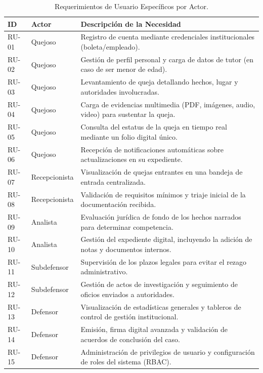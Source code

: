 \documentclass[12pt, oneside, letterpaper]{book}
\begin{document}
\begin{table}[H]
\centering
\caption{Requerimientos de Usuario Específicos por Actor.}
\begin{tabularx}{\textwidth}{@{} l l L @{}}
\toprule
{}
\textbf{\color{white} ID} & \textbf{\color{white} Actor} &
\textbf{\color{white} Descripción de la Necesidad} \\ \midrule
{}
RU-01 & Quejoso & Registro de cuenta mediante credenciales institucionales (boleta/empleado). \\
RU-02 & Quejoso & Gestión de perfil personal y carga de datos de tutor (en caso de ser menor de edad). \\
RU-03 & Quejoso & Levantamiento de queja detallando hechos, lugar y autoridades involucradas. \\
RU-04 & Quejoso & Carga de evidencias multimedia (PDF, imágenes, audio, video) para sustentar la queja. \\
RU-05 & Quejoso & Consulta del estatus de la queja en tiempo real mediante un folio digital único. \\
RU-06 & Quejoso & Recepción de notificaciones automáticas sobre actualizaciones en su expediente. \\ \midrule
{}
RU-07 & Recepcionista & Visualización de quejas entrantes en una bandeja de entrada centralizada. \\
RU-08 & Recepcionista & Validación de requisitos mínimos y triaje inicial de la documentación recibida. \\ \midrule
{}
RU-09 & Analista & Evaluación jurídica de fondo de los hechos narrados para determinar competencia. \\
RU-10 & Analista & Gestión del expediente digital, incluyendo la adición de notas y documentos internos. \\ \midrule
{}
RU-11 & Subdefensor & Supervisión de los plazos legales para evitar el rezago administrativo. \\
RU-12 & Subdefensor & Gestión de actos de investigación y seguimiento de oficios enviados a autoridades. \\ \midrule
{}
RU-13 & Defensor & Visualización de estadísticas generales y tableros de control de gestión institucional. \\
RU-14 & Defensor & Emisión, firma digital avanzada y validación de acuerdos de conclusión del caso. \\
RU-15 & Defensor & Administración de privilegios de usuario y configuración de roles del sistema (RBAC). \\ \bottomrule
\end{tabularx}
\end{table}
\end{document}
